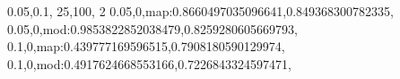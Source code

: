 0.05,0.1,
25,100,
2
0.05,0,map:0.8660497035096641,0.849368300782335,
0.05,0,mod:0.9853822852038479,0.8259280605669793,
0.1,0,map:0.439777169596515,0.7908180590129974,
0.1,0,mod:0.4917624668553166,0.7226843324597471,
